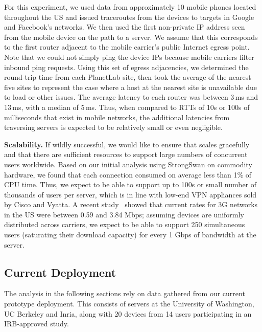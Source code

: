 For this experiment, 
we used data from approximately 10 mobile phones located throughout
the US and issued traceroutes from the devices to targets in Google
and Facebook's networks. We then used the first non-private IP address seen 
from the mobile device on the path to a server. We assume that this corresponds 
to the first router adjacent to the mobile carrier's public Internet egress point. Note that we could not simply ping the device IPs because mobile carriers filter inbound ping requests. Using this set of egress adjacencies, we determined the round-trip time from each PlanetLab site, then took the average of the nearest five sites to represent the case where a host at the nearest site is unavailable due to load or other issues. The average latency to each router was between 3\,ms and 13\,ms, with a median of 5\,ms. Thus, when compared to RTTs of 10s or 100s of milliseconds that exist in mobile networks, the additional latencies from traversing \meddle servers is expected to be relatively small or even negligible.




\noindent\textbf{Scalability.} If wildly successful, we would like to
ensure that \meddle scales gracefully and that there are sufficient
resources to support large numbers of concurrent users
worldwide. Based on our initial analysis using StrongSwan on commodity
hardware, we found that each connection consumed on average less than
1\% of CPU time. Thus, we expect to be able to support up to 100s or
small number of thousands of users per server, which is in line with
low-end VPN appliances sold by Cisco and Vyatta. A recent
study~\cite{pcworld-speedtests} showed that current rates for 3G
networks in the US were between 0.59 and 3.84 Mbps; assuming devices
are uniformly distributed across carriers, we expect to be able to
support 250 simultaneous users (saturating their download capacity)
for every 1 Gbps of bandwidth at the server.

\subsection{Current Deployment}
The analysis in the following sections rely on data gathered from 
our current prototype deployment. This consists of \meddle servers at the University of Washington, 
UC Berkeley and Inria, along with 20 devices from 14 users participating 
in an IRB-approved study. 

